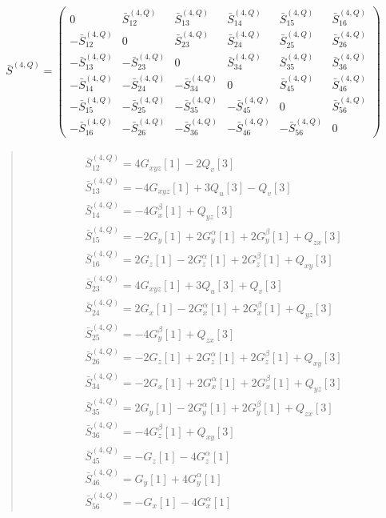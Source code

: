 \documentclass[fleqn,10pt]{jsarticle}
\begin{document}
\begin{align*}
\bar{S}^{(4,Q)} = \begin{pmatrix} 0 & \bar{S}^{(4,Q)}_{12} & \bar{S}^{(4,Q)}_{13} & \bar{S}^{(4,Q)}_{14} & \bar{S}^{(4,Q)}_{15} & \bar{S}^{(4,Q)}_{16} \\ - \bar{S}^{(4,Q)}_{12} & 0 & \bar{S}^{(4,Q)}_{23} & \bar{S}^{(4,Q)}_{24} & \bar{S}^{(4,Q)}_{25} & \bar{S}^{(4,Q)}_{26} \\ - \bar{S}^{(4,Q)}_{13} & - \bar{S}^{(4,Q)}_{23} & 0 & \bar{S}^{(4,Q)}_{34} & \bar{S}^{(4,Q)}_{35} & \bar{S}^{(4,Q)}_{36} \\ - \bar{S}^{(4,Q)}_{14} & - \bar{S}^{(4,Q)}_{24} & - \bar{S}^{(4,Q)}_{34} & 0 & \bar{S}^{(4,Q)}_{45} & \bar{S}^{(4,Q)}_{46} \\ - \bar{S}^{(4,Q)}_{15} & - \bar{S}^{(4,Q)}_{25} & - \bar{S}^{(4,Q)}_{35} & - \bar{S}^{(4,Q)}_{45} & 0 & \bar{S}^{(4,Q)}_{56} \\ - \bar{S}^{(4,Q)}_{16} & - \bar{S}^{(4,Q)}_{26} & - \bar{S}^{(4,Q)}_{36} & - \bar{S}^{(4,Q)}_{46} & - \bar{S}^{(4,Q)}_{56} & 0 \end{pmatrix}
\end{align*}
\begin{quote}
\begin{align*}
& \bar{S}^{(4,Q)}_{12} = 4 G_{xyz}[1] - 2 Q_{v}[3] \\
& \bar{S}^{(4,Q)}_{13} = - 4 G_{xyz}[1] + 3 Q_{u}[3] - Q_{v}[3] \\
& \bar{S}^{(4,Q)}_{14} = - 4 G_{x}^{\beta}[1] + Q_{yz}[3] \\
& \bar{S}^{(4,Q)}_{15} = - 2 G_{y}[1] + 2 G_{y}^{\alpha}[1] + 2 G_{y}^{\beta}[1] + Q_{zx}[3] \\
& \bar{S}^{(4,Q)}_{16} = 2 G_{z}[1] - 2 G_{z}^{\alpha}[1] + 2 G_{z}^{\beta}[1] + Q_{xy}[3] \\
& \bar{S}^{(4,Q)}_{23} = 4 G_{xyz}[1] + 3 Q_{u}[3] + Q_{v}[3] \\
& \bar{S}^{(4,Q)}_{24} = 2 G_{x}[1] - 2 G_{x}^{\alpha}[1] + 2 G_{x}^{\beta}[1] + Q_{yz}[3] \\
& \bar{S}^{(4,Q)}_{25} = - 4 G_{y}^{\beta}[1] + Q_{zx}[3] \\
& \bar{S}^{(4,Q)}_{26} = - 2 G_{z}[1] + 2 G_{z}^{\alpha}[1] + 2 G_{z}^{\beta}[1] + Q_{xy}[3] \\
& \bar{S}^{(4,Q)}_{34} = - 2 G_{x}[1] + 2 G_{x}^{\alpha}[1] + 2 G_{x}^{\beta}[1] + Q_{yz}[3] \\
& \bar{S}^{(4,Q)}_{35} = 2 G_{y}[1] - 2 G_{y}^{\alpha}[1] + 2 G_{y}^{\beta}[1] + Q_{zx}[3] \\
& \bar{S}^{(4,Q)}_{36} = - 4 G_{z}^{\beta}[1] + Q_{xy}[3] \\
& \bar{S}^{(4,Q)}_{45} = - G_{z}[1] - 4 G_{z}^{\alpha}[1] \\
& \bar{S}^{(4,Q)}_{46} = G_{y}[1] + 4 G_{y}^{\alpha}[1] \\
& \bar{S}^{(4,Q)}_{56} = - G_{x}[1] - 4 G_{x}^{\alpha}[1]
\end{align*}
\end{quote}
\end{document}
